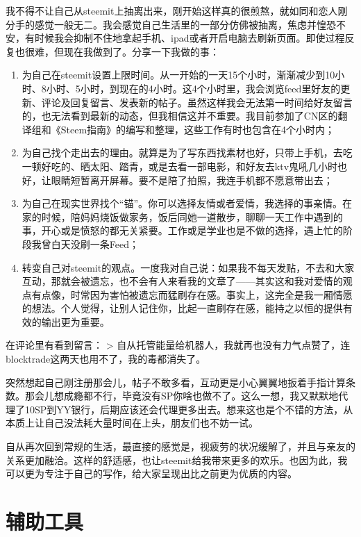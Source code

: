 \documentclass[]{ctexbook}
\begin{document}
我不得不让自己从steemit上抽离出来，刚开始这样真的很煎熬，就如同和恋人刚分手的感觉一般无二。我会感觉自己生活里的一部分仿佛被抽离，焦虑并惶恐不安，有时候我会抑制不住地拿起手机、ipad或者开启电脑去刷新页面。即使过程反复也很难，但现在我做到了。分享一下我做的事：

\begin{enumerate}
\def\labelenumi{\arabic{enumi}.}
\item
  为自己在steemit设置上限时间。从一开始的一天15个小时，渐渐减少到10小时、8小时、5小时，到现在的4小时。这4个小时里，我会浏览feed里好友的更新、评论及回复留言、发表新的帖子。虽然这样我会无法第一时间给好友留言的，也无法看到最新的动态，但我相信这并不重要。我目前参加了CN区的翻译组和《Steem指南》的编写和整理，这些工作有时也包含在4个小时内；
\item
  为自己找个走出去的理由。就算是为了写东西找素材也好，只带上手机，去吃一顿好吃的、晒太阳、踏青，或是去看一部电影，和好友去ktv鬼吼几小时也好，让眼睛短暂离开屏幕。要不是陪了拍照，我连手机都不愿意带出去；
\item
  为自己在现实世界找个``锚''。你可以选择友情或者爱情，我选择的事亲情。在家的时候，陪妈妈烧饭做家务，饭后同她一道散步，聊聊一天工作中遇到的事，开心或是愤怒的都无关紧要。工作或是学业也是不做的选择，遇上忙的阶段我曾白天没刷一条Feed；
\item
  转变自己对steemit的观点。一度我对自己说：如果我不每天发贴，不去和大家互动，那就会被遗忘，也不会有人来看我的文章了------其实这和我对爱情的观点有点像，时常因为害怕被遗忘而猛刷存在感。事实上，这完全是我一厢情愿的想法。个人觉得，让别人记住你，比起一直刷存在感，能持之以恒的提供有效的输出更为重要。
\end{enumerate}

在评论里有看到留言：
\textgreater{} 自从托管能量给机器人，我就再也没有力气点赞了，连blocktrade这两天也用不了，我的毒都消失了。

突然想起自己刚注册那会儿，帖子不敢多看，互动更是小心翼翼地扳着手指计算条数。那会儿想成瘾都不行，毕竟没有SP你啥也做不了。这么一想，我又默默地代理了10SP到YY银行，后期应该还会代理更多出去。想来这也是个不错的方法，从本质上让自己没法耗大量时间在上头，朋友们也不妨一试。

自从再次回到常规的生活，最直接的感觉是，视疲劳的状况缓解了，并且与亲友的关系更加融洽。这样的舒适感，也让steemit给我带来更多的欢乐。也因为此，我可以更为专注于自己的写作，给大家呈现出比之前更为优质的内容。

\hypertarget{fcgjp}{%
\chapter{辅助工具}\label{fcgjp}}
\end{document}
